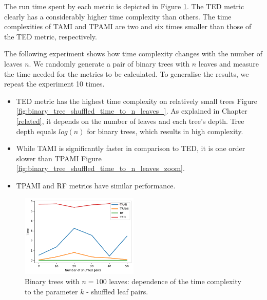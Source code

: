 The run time spent by each metric is depicted in Figure \ref{fig:binary_tree_shuffled_time}. The TED metric clearly has a considerably higher time complexity than others. The time complexities of TAMI and TPAMI are two and six times smaller than those of the TED metric, respectively. 

The following experiment shows how time complexity changes with the number of leaves $n$. We randomly generate a pair of binary trees with $n$ leaves and measure the time needed for the metrics to be calculated. To generalise the results, we repeat the experiment 10 times. 

\begin{itemize}
	\item TED metric has the highest time complexity on relatively small trees Figure \ref{fig:binary_tree_shuffled_time_to_n_leaves_}.  As explained in Chapter \ref{related}, it depends on the number of leaves and each tree's depth. Tree depth equals $log(n)$ for binary trees, which results in high complexity. 
	\item While TAMI is significantly faster in comparison to TED, it is one order slower than TPAMI Figure \ref{fig:binary_tree_shuffled_time_to_n_leaves_zoom}.
	\item TPAMI and RF metrics have similar performance. 
\end{itemize}

\begin{figure}[H]
	\begin{center}
		\includegraphics[width=0.5\textwidth]{figures/1-syntatic-time-trees-binary.pdf}
		\caption{Binary trees with $n=100$ leaves: dependence of the time complexity to the parameter $k$ - shuffled leaf pairs.}
		\label{fig:binary_tree_shuffled_time}
	\end{center}
\end{figure}

